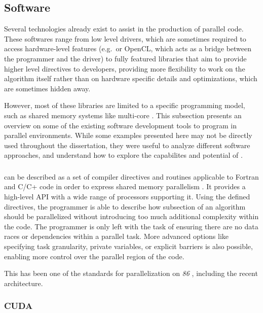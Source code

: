 \documentclass[main.tex]{subfiles}
\begin{document}
\subsection{Software}

Several technologies already exist to assist in the production of parallel code. These softwares range from low level drivers, which are sometimes required to access hardware-level features (e.g.\ \cuda or \acs{OpenCL}, which acts as a bridge between the programmer and the \gpu driver) to fully featured libraries that aim to provide higher level directives to developers, providing more flexibility to work on the algorithm itself rather than on hardware specific details and optimizations, which are sometimes hidden away.

However, most of these libraries are limited to a specific programming model, such as shared memory systems like multi-core \cpus\xspace. This subsection presents an overview on some of the existing software development tools to program in parallel environments. While some examples presented here may not be directly used throughout the dissertation, they were useful to analyze different software approaches, and understand how to explore the capabilites and potential of \gama.


\subsubsection{\openmp}

\openmp can be described as a set of compiler directives and routines applicable to Fortran and C/C+ code in order to express shared memory parallelism \cite{dagum1998openmp}. It provides a high-level API with a wide range of processors supporting it.
Using the defined directives, the programmer is able to describe how subsection of an algorithm should be parallelized without introducing too much additional complexity within the code. The programmer is only left with the task of ensuring there are no data races or dependencies within a parallel task. More advanced options like specifying task granularity, private variables, or explicit barriers is also possible, enabling more control over the parallel region of the code.

This has been one of the standards for parallelization on \textit{86} \cpus, including the recent \intel \mic architecture.


\subsubsection{CUDA}
\end{document}
